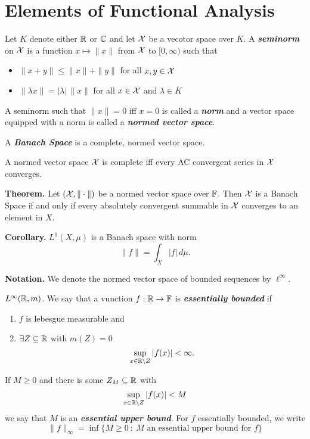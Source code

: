 \newpage
\section{Elements of Functional Analysis}

\vs

\dfn Let $K$ denote either $\mathbb{R}$ or $\mathbb{C}$ and let $\mathcal{X}$ be a vecotor space over $K$. A \textbf{\textit{seminorm}} on $\mathcal{X}$ is a function $x\mapsto \|x\|$ from $\mathcal{X}$ to $[0,\infty)$ such that
\begin{itemize}
    \item $\|x + y\| \leq \|x\| + \|y\|$ for all $x,y\in \mathcal{X}$
    \item $\|\lambda x\| = |\lambda|\,\|x\|$ for all $x\in \mathcal{X}$ and $\lambda\in K$
\end{itemize}
A seminorm such that $\|x\| = 0$ iff $x = 0$ is called a \textbf{\textit{norm}} and a vector space equipped with a norm is called a \textbf{\textit{normed vector space}}.

\vs

\dfn A \textbf{\textit{Banach Space}} is a complete, normed vector space.

\vs

\begin{thm}
A normed vector space $\mathcal{X}$ is complete iff every AC convergent series in $\mathcal{X}$ converges.
\end{thm}

\vs

\textbf{Theorem.} Let $(\mathcal{X}, \|\cdot\|)$ be a normed vector space over $\mathbb{F}$. Then $\mathcal{X}$ is a Banach Space if and only if every absolutely convergent summable in $\mathcal{X}$ converges to an element in $X$.

\vs

\textbf{Corollary.} $L^1(X,\mu)$ is a Banach space with norm
\[\|f\| = \int_X|f|\,d\mu.\]

\vs

\textbf{Notation.} We denote the normed vector space of bounded sequences by $\ell^\infty$.

\vs

\dfn $L^\infty(\mathbb{R}, m)$. We say that a vunction $f:\mathbb{R}\rightarrow \mathbb{F}$ is \textbf{\textit{essentially bounded}} if
\begin{enumerate}
    \item $f$ is lebesgue measurable and
    \item $\exists Z\subseteq \mathbb{R}$ with $m(Z) = 0$
    \[\sup_{x\in \mathbb{R}\backslash Z}|f(x)| < \infty.\]
\end{enumerate}
If $M\geq 0$ and there is some $Z_M\subseteq \mathbb{R}$ with
\[\sup_{x\in \mathbb{R}\backslash Z}|f(x)| < M\]
we say that $M$ is an \textbf{\textit{essential upper bound}}. For $f$ essentially bounded, we write
\[\|f\|_\infty = \inf\{M\geq 0\ :\ M\text{ an essential upper bound for $f$}\}\]

